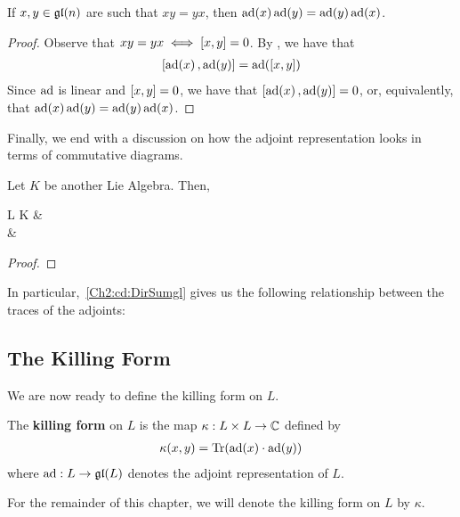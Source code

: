 \begin{boxlemma}
    If $x, y \in \mathfrak{gl}\!\left( n \right)$ are such that $xy = yx$, then $\operatorname{ad}\!\left( x \right) \operatorname{ad}\!\left( y \right) = \operatorname{ad}\!\left( y \right) \operatorname{ad}\!\left( x \right)$.
\end{boxlemma}
\begin{proof}
    Observe that $xy = yx \iff \left[ x, y \right] = 0$. By , we have that
    \begin{align*}
        \left[ \operatorname{ad}\!\left( x \right), \operatorname{ad}\!\left( y \right) \right] = \operatorname{ad}\!\left( \left[ x, y \right] \right)
    \end{align*}
    Since $\operatorname{ad}$ is linear and $\left[ x, y \right] = 0$, we have that $\left[ \operatorname{ad}\!\left( x \right), \operatorname{ad}\!\left( y \right) \right] = 0$, or, equivalently, that $\operatorname{ad}\!\left( x \right) \operatorname{ad}\!\left( y \right) = \operatorname{ad}\!\left( y \right) \operatorname{ad}\!\left( x \right)$.
\end{proof}

Finally, we end with a discussion on how the adjoint representation looks in terms of commutative diagrams.

\begin{boxproposition}
    Let $K$ be another Lie Algebra. Then,
    \begin{cd}
        L \+ K \arrow[r, "\ad_{L \+ K}"] \arrow[rd, "\ad_{L} \+ \ad_{K}"'] &  \\
        &  \+  \arrow[u, hook]
        \label{Ch2:cd:DirSumgl}
    \end{cd}
\end{boxproposition}
\begin{proof}
    \sorry
\end{proof}

In particular,~\eqref{Ch2:cd:DirSumgl} gives us the following relationship between the traces of the adjoints: \sorry

\subsection{The Killing Form}

We are now ready to define the killing form on $L$.

\begin{boxdefinition}
    The \textbf{killing form} on $L$ is the map $\kappa : L \times L \to \mathbb{C}$ defined by
    \begin{align}
        \kappa(x, y) = \operatorname{Tr}\!\left( \operatorname{ad}\!\left( x \right) \cdot \operatorname{ad}\!\left( y \right) \right)
    \end{align}
    where $\operatorname{ad} : L \to \mathfrak{gl}\!\left( L \right)$ denotes the adjoint representation of $L$.
\end{boxdefinition}

\begin{boxconvention}
    For the remainder of this chapter, we will denote the killing form on $L$ by $\kappa$.
\end{boxconvention}

